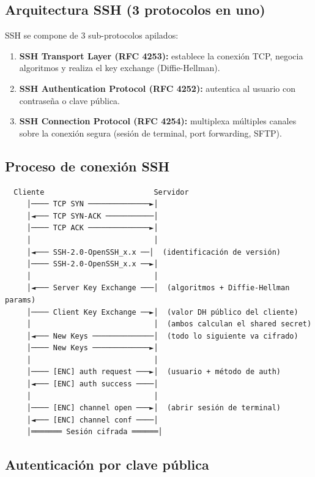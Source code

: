 \subsection{Arquitectura SSH (3 protocolos en uno)}

SSH se compone de 3 sub-protocolos apilados:
\begin{enumerate}
    \item \textbf{SSH Transport Layer (RFC 4253):} establece la conexión TCP,
          negocia algoritmos y realiza el key exchange (Diffie-Hellman).
    \item \textbf{SSH Authentication Protocol (RFC 4252):} autentica al usuario
          con contraseña o clave pública.
    \item \textbf{SSH Connection Protocol (RFC 4254):} multiplexa múltiples
          canales sobre la conexión segura (sesión de terminal, port forwarding, SFTP).
\end{enumerate}

\subsection{Proceso de conexión SSH}

\begin{lstlisting}
  Cliente                         Servidor
     │──── TCP SYN ──────────────►│
     │◄─── TCP SYN-ACK ───────────│
     │──── TCP ACK ──────────────►│
     │                            │
     │◄─── SSH-2.0-OpenSSH_x.x ──│  (identificación de versión)
     │──── SSH-2.0-OpenSSH_x.x ──►│
     │                            │
     │◄─── Server Key Exchange ───│  (algoritmos + Diffie-Hellman params)
     │──── Client Key Exchange ──►│  (valor DH público del cliente)
     │                            │  (ambos calculan el shared secret)
     │◄─── New Keys ──────────────│  (todo lo siguiente va cifrado)
     │──── New Keys ─────────────►│
     │                            │
     │──── [ENC] auth request ───►│  (usuario + método de auth)
     │◄─── [ENC] auth success ────│
     │                            │
     │──── [ENC] channel open ───►│  (abrir sesión de terminal)
     │◄─── [ENC] channel conf ────│
     │═══════ Sesión cifrada ══════│
\end{lstlisting}

\subsection{Autenticación por clave pública}

